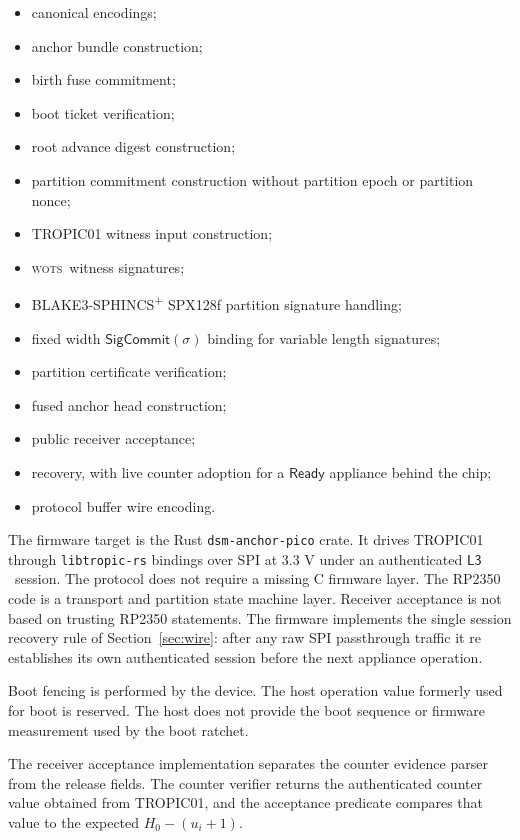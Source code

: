 \documentclass[11pt]{article}
\theoremstyle{definition}
\theoremstyle{remark}
\newcommand{\SigCommit}{\ensuremath{\mathsf{SigCommit}}}
\newcommand{\WOTS}{\textsc{wots}}
\newcommand{\Lthree}{\ensuremath{\mathsf{L3}}}
\newcommand{\Ready}{\ensuremath{\mathsf{Ready}}}
\begin{document}
\begin{itemize}
\item canonical encodings;
\item anchor bundle construction;
\item birth fuse commitment;
\item boot ticket verification;
\item root advance digest construction;
\item partition commitment construction without partition epoch or partition nonce;
\item TROPIC01 witness input construction;
\item \WOTS\ witness signatures;
\item BLAKE3-SPHINCS\textsuperscript{+} SPX128f partition signature handling;
\item fixed width \(\SigCommit(\sigma)\) binding for variable length signatures;
\item partition certificate verification;
\item fused anchor head construction;
\item public receiver acceptance;
\item recovery, with live counter adoption for a \(\Ready\) appliance behind the chip;
\item protocol buffer wire encoding.
\end{itemize}

The firmware target is the Rust \texttt{dsm-anchor-pico} crate. It drives TROPIC01 through
\texttt{libtropic-rs} bindings over SPI at 3.3 V under an authenticated \Lthree\ session. The
protocol does not require a missing C firmware layer. The RP2350 code is a transport and partition
state machine layer. Receiver acceptance is not based on trusting RP2350 statements. The firmware
implements the single session recovery rule of Section~\ref{sec:wire}: after any raw SPI
passthrough traffic it re establishes its own authenticated session before the next appliance
operation.

Boot fencing is performed by the device. The host operation value formerly used for boot is
reserved. The host does not provide the boot sequence or firmware measurement used by the boot
ratchet.

The receiver acceptance implementation separates the counter evidence parser from the release
fields. The counter verifier returns the authenticated counter value obtained from TROPIC01, and
the acceptance predicate compares that value to the expected \(H_0-(u_i+1)\).
\end{document}
